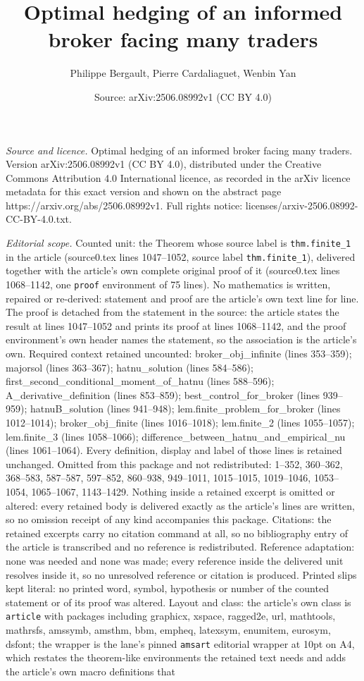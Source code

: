 \documentclass[10pt,a4paper]{amsart}
\title[Optimal hedging of an informed broker facing many traders]{Optimal hedging of an informed broker facing many traders}
\author{Philippe Bergault, Pierre Cardaliaguet, Wenbin Yan}
\date{Source: arXiv:2506.08992v1 (CC BY 4.0)}
\begin{document}
\maketitle

\noindent\emph{Source and licence.} Optimal hedging of an informed broker facing many traders. Version arXiv:2506.08992v1 (CC BY 4.0), distributed under the Creative Commons Attribution 4.0 International licence, as recorded in the arXiv licence metadata for this exact version and shown on the abstract page https://arxiv.org/abs/2506.08992v1. Full rights notice: licenses/arxiv-2506.08992-CC-BY-4.0.txt.\par\smallskip

\noindent\textit{Editorial scope.} Counted unit: the Theorem whose source label is \texttt{thm.finite\_1} in the article (source0.tex lines 1047--1052, source label \texttt{thm.finite\_1}), delivered together with the article's own complete original proof of it (source0.tex lines 1068--1142, one \texttt{proof} environment of 75 lines). No mathematics is written, repaired or re-derived: statement and proof are the article's own text line for line. The proof is detached from the statement in the source: the article states the result at lines 1047--1052 and prints its proof at lines 1068--1142, and the proof environment's own header names the statement, so the association is the article's own. Required context retained uncounted: broker\_obj\_infinite (lines 353--359); majorsol (lines 363--367); hatnu\_solution (lines 584--586); first\_second\_conditional\_moment\_of\_hatnu (lines 588--596); A\_derivative\_definition (lines 853--859); best\_control\_for\_broker (lines 939--959); hatnuB\_solution (lines 941--948); lem.finite\_problem\_for\_broker (lines 1012--1014); broker\_obj\_finite (lines 1016--1018); lem.finite\_2 (lines 1055--1057); lem.finite\_3 (lines 1058--1066); difference\_between\_hatnu\_and\_empirical\_nu (lines 1061--1064). Every definition, display and label of those lines is retained unchanged. Omitted from this package and not redistributed: 1--352, 360--362, 368--583, 587--587, 597--852, 860--938, 949--1011, 1015--1015, 1019--1046, 1053--1054, 1065--1067, 1143--1429. Nothing inside a retained excerpt is omitted or altered: every retained body is delivered exactly as the article's lines are written, so no omission receipt of any kind accompanies this package. Citations: the retained excerpts carry no citation command at all, so no bibliography entry of the article is transcribed and no reference is redistributed. Reference adaptation: none was needed and none was made; every reference inside the delivered unit resolves inside it, so no unresolved reference or citation is produced. Printed slips kept literal: no printed word, symbol, hypothesis or number of the counted statement or of its proof was altered. Layout and class: the article's own class is \texttt{article} with packages including graphicx, xspace, ragged2e, url, mathtools, mathrsfs, amssymb, amsthm, bbm, empheq, latexsym, enumitem, eurosym, dsfont; the wrapper is the lane's pinned \texttt{amsart} editorial wrapper at 10pt on A4, which restates the theorem-like environments the retained text needs and adds the article's own macro definitions that 
\end{document}
